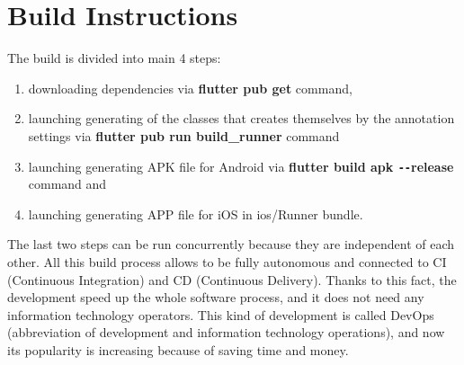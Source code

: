 \section{Build Instructions}\label{sec:build-instructions}
The build is divided into main 4 steps:
\begin{enumerate}
    \item downloading dependencies via \textbf{flutter pub get} command,
    \item launching generating of the classes that creates themselves by the annotation settings via \textbf{flutter pub run build\_runner} command
    \item launching generating APK file for Android via \textbf{flutter build apk \texttt{-{}-}release} command and
    \item launching generating APP file for iOS in ios/Runner bundle.
\end{enumerate}
The last two steps can be run concurrently because they are independent of each other.
All this build process allows to be fully autonomous and connected to CI (Continuous Integration) and CD (Continuous Delivery).
Thanks to this fact, the development speed up the whole software process, and it does not need any information technology operators.
This kind of development is called DevOps (abbreviation of development and information technology operations), and now its popularity is increasing because of saving time and money.
